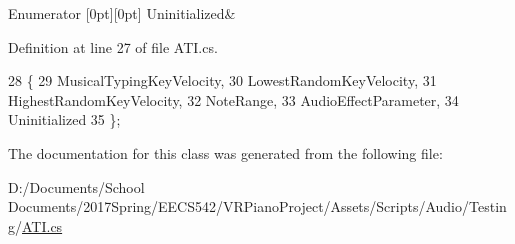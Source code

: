 \begin{DoxyEnumFields}{Enumerator}
[0pt][0pt]{}\mbox{\label{class_a_t_i_ac4c6056a99cbd16ff0d292d33b038b9baf704f57ea420275ad51bf55b7dec2c96}} 
Uninitialized&\\
\hline

\end{DoxyEnumFields}


Definition at line 27 of file A\+T\+I.\+cs.


\begin{DoxyCode}
28     \{
29         MusicalTypingKeyVelocity,
30         LowestRandomKeyVelocity,
31         HighestRandomKeyVelocity,
32         NoteRange,
33         AudioEffectParameter,
34         Uninitialized
35     \};
\end{DoxyCode}


The documentation for this class was generated from the following file\+:\begin{DoxyCompactItemize}
\item 
D\+:/\+Documents/\+School Documents/2017\+Spring/\+E\+E\+C\+S542/\+V\+R\+Piano\+Project/\+Assets/\+Scripts/\+Audio/\+Testing/\hyperlink{_a_t_i_8cs}{A\+T\+I.\+cs}\end{DoxyCompactItemize}
